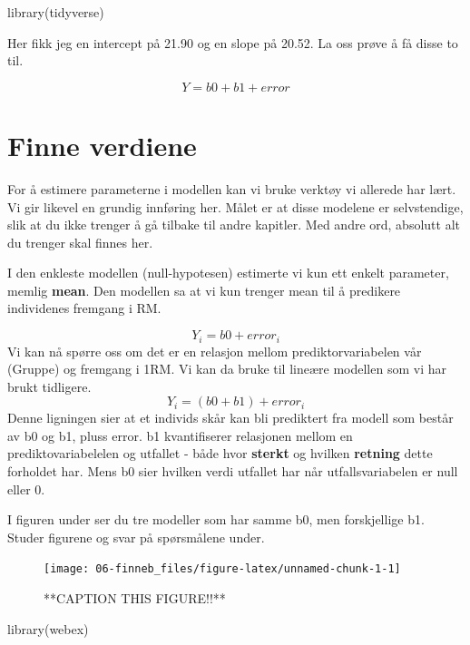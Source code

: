 \documentclass[
]{book}
\newenvironment{Shaded}{\begin{snugshade}}{\end{snugshade}}
\newcommand{\FunctionTok}[1]{\textcolor[rgb]{0.00,0.00,0.00}{#1}}
\newcommand{\NormalTok}[1]{#1}
\begin{document}
\begin{Shaded}
\begin{Highlighting}[]
\FunctionTok{library}\NormalTok{(tidyverse)}
\end{Highlighting}
\end{Shaded}

Her fikk jeg en intercept på 21.90 og en slope på 20.52. La oss prøve å få disse to til.

\[
Y = b0 + b1 + error
\]

\hypertarget{finne-verdiene}{%
\chapter{Finne verdiene}\label{finne-verdiene}}

For å estimere parameterne i modellen kan vi bruke verktøy vi allerede har lært. Vi gir likevel en grundig innføring her. Målet er at disse modelene er selvstendige, slik at du ikke trenger å gå tilbake til andre kapitler. Med andre ord, absolutt alt du trenger skal finnes her.

I den enkleste modellen (null-hypotesen) estimerte vi kun ett enkelt parameter, memlig \textbf{mean}. Den modellen sa at vi kun trenger mean til å predikere individenes fremgang i RM.

\[
Y_i = b0 + error_i
\]
Vi kan nå spørre oss om det er en relasjon mellom prediktorvariabelen vår (Gruppe) og fremgang i 1RM. Vi kan da bruke til lineære modellen som vi har brukt tidligere.\\
\[
Y_i = (b0 + b1) + error_i
\]
Denne ligningen sier at et individs skår kan bli prediktert fra modell som består av b0 og b1, pluss error. b1 kvantifiserer relasjonen mellom en prediktovariabelelen og utfallet - både hvor \textbf{sterkt} og hvilken \textbf{retning} dette forholdet har. Mens b0 sier hvilken verdi utfallet har når utfallsvariabelen er null eller 0.

I figuren under ser du tre modeller som har samme b0, men forskjellige b1. Studer figurene og svar på spørsmålene under.

\begin{figure}

{\centering \texttt{[image: 06-finneb\_files/figure-latex/unnamed-chunk-1-1]} 

}

\caption{**CAPTION THIS FIGURE!!**}\label{fig:unnamed-chunk-1}
\end{figure}

\begin{Shaded}
\begin{Highlighting}[]
\FunctionTok{library}\NormalTok{(webex)}
\end{Highlighting}
\end{Shaded}
\end{document}
